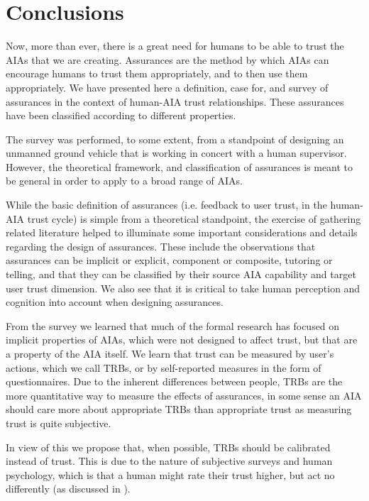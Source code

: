 \section{Conclusions}\label{sec:conclusions}
    Now, more than ever, there is a great need for humans to be able to trust the AIAs that we are creating. Assurances are the method by which AIAs can encourage humans to trust them appropriately, and to then use them appropriately. We have presented here a definition, case for, and survey of assurances in the context of human-AIA trust relationships. These assurances have been classified according to different properties.
    
    The survey was performed, to some extent, from a standpoint of designing an unmanned ground vehicle that is working in concert with a human supervisor. However, the theoretical framework, and classification of assurances is meant to be general in order to apply to a broad range of AIAs.

    While the basic definition of assurances (i.e. feedback to user trust, in the human-AIA trust cycle) is simple from a theoretical standpoint, the exercise of gathering related literature helped to illuminate some important considerations and details regarding the design of assurances. These include the observations that assurances can be implicit or explicit, component or composite, tutoring or telling, and that they can be classified by their source AIA capability and target user trust dimension. We also see that it is critical to take human perception and cognition into account when designing assurances.

    From the survey we learned that much of the formal research has focused on implicit properties of AIAs, which were not designed to affect trust, but that are a property of the AIA itself. We learn that trust can be measured by user's actions, which we call TRBs, or by self-reported measures in the form of questionnaires. Due to the inherent differences between people, TRBs are the more quantitative way to measure the effects of assurances, in some sense an AIA should care more about appropriate TRBs than appropriate trust as measuring trust is quite subjective.

    In view of this we propose that, when possible, TRBs should be calibrated instead of trust. This is due to the nature of subjective surveys and human psychology, which is that a human might rate their trust higher, but act no differently (as discussed in \cite{Dzindolet2003-ts}).

